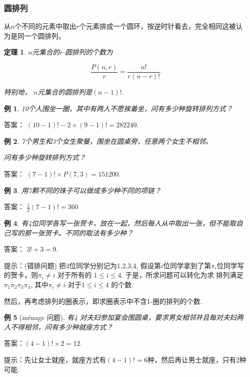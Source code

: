 \documentclass[13pt, punct]{ctexbeamer}
\newtheorem{thm}{定理}[section]
\newtheorem{ex}{例}[section]
\begin{document}
\begin{frame}\frametitle{圆排列}

从$n$个不同的元素中取出$r$个元素排成一个圆环，按逆时针看去，完全相同这被认为是同一个\alert{圆排列}。
\begin{thm}
	$n$元集合的$r$-圆排列的个数为

	$$\frac{P(n,r)}{r}=\frac{n!}{r(n-r)!}.$$

	特别地， $n$元集合的圆排列是$(n-1)!.$
\end{thm}
\begin{ex}
10个人围坐一圈，其中有两人不愿挨着坐，问有多少种旋转排列方式？
\end{ex}
\pause
答案： $(10-1)! -2\times (9-1)!=282240.$
\end{frame}


\begin{frame}
\begin{ex}
	7个男生和3个女生聚餐，围坐在圆桌旁，任意两个女生不相邻。

	问有多少种旋转排列方式？
\end{ex}
\pause
答案： $(7-1)! \times P(7,3)=151200.$
\end{frame}


\begin{frame}
	\begin{ex}
	用7颗不同的珠子可以做成多少种不同的项链？
\end{ex}
\pause
答案：	$\frac{1}{2}(7-1)!=360$
\end{frame}
\begin{frame}
\begin{ex}
有4位同学各写一张贺卡，放在一起，然后每人从中取出一张，但不能取自己写的那一张贺卡。不同的取法有多少种？
\end{ex}
\pause
答案： $3!+3=9.$



提示：(错排问题)
把4位同学分别记为1,2,3,4, 假设第$i$位同学拿到了第$\pi_i$位同学写的贺卡，则$\pi_i \neq i$ 对于所有的 $1\le i  \le 4$.
于是，所求问题可以转化为求 排列满足
$\pi_1 \pi_2 \pi_3 \pi_4$, 其中$\pi_i \neq i$ 对于$1\le i  \le 4$
的个数.

然后，再考虑排列的圈表示，即求圈表示中不含1-圈的排列的个数.
\end{frame}


\begin{frame}
	\begin{ex}[m\' enage 问题]
		有4 对夫妇参加宴会围圆桌，要求男女相邻并且每对夫妇两人不得相邻，问有多少种就座方式？
	\end{ex}
	\pause
	答案：$(4-1)! \times 2 =  12$.


	提示：先让女士就座，就座方式有$(4-1)! =6$种，然后再让男士就座，只有2种可能.



\end{frame}
\end{document}
